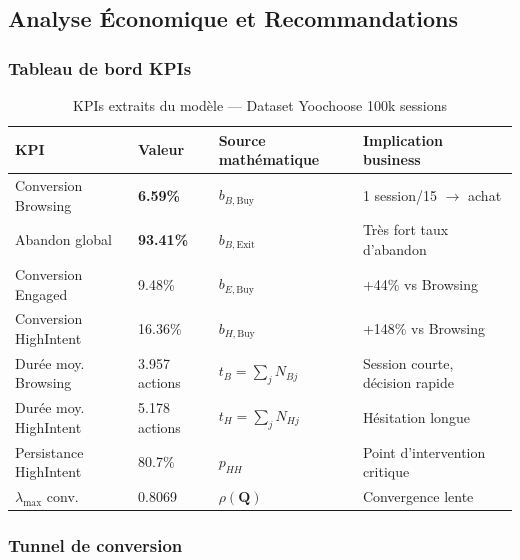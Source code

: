 \documentclass[11pt,a4paper]{article}
\newcommand{\mat}[1]{\mathbf{#1}}
\begin{document}
\subsection{Analyse Économique et Recommandations}

\subsubsection{Tableau de bord KPIs}

\begin{table}[H]
\centering
\caption{KPIs extraits du modèle --- Dataset Yoochoose 100k sessions}
\label{tab:kpis}
\begin{tabularx}{\textwidth}{lXXX}
\toprule
\rowcolor{DarkBlue}
\color{white}\textbf{KPI} &
\color{white}\textbf{Valeur} &
\color{white}\textbf{Source mathématique} &
\color{white}\textbf{Implication business} \\
\midrule
Conversion Browsing &
  \cellcolor{LightBuy}\textbf{6.59\%} & $b_{B,\text{Buy}}$ &
  1 session/15 $\to$ achat \\
\rowcolor{LightGray}
Abandon global &
  \cellcolor{LightRed}\textbf{93.41\%} & $b_{B,\text{Exit}}$ &
  Très fort taux d'abandon \\
Conversion Engaged &
  9.48\% & $b_{E,\text{Buy}}$ &
  +44\% vs Browsing \\
\rowcolor{LightGray}
Conversion HighIntent &
  16.36\% & $b_{H,\text{Buy}}$ &
  +148\% vs Browsing \\
Durée moy. Browsing &
  3.957 actions & $t_B = \sum_j N_{Bj}$ &
  Session courte, décision rapide \\
\rowcolor{LightGray}
Durée moy. HighIntent &
  5.178 actions & $t_H = \sum_j N_{Hj}$ &
  Hésitation longue \\
Persistance HighIntent &
  80.7\% & $p_{HH}$ &
  Point d'intervention critique \\
\rowcolor{LightGray}
$\lambda_{\max}$ conv. &
  0.8069 & $\rho(\mat{Q})$ &
  Convergence lente \\
\bottomrule
\end{tabularx}
\end{table}

\subsubsection{Tunnel de conversion}
\end{document}
